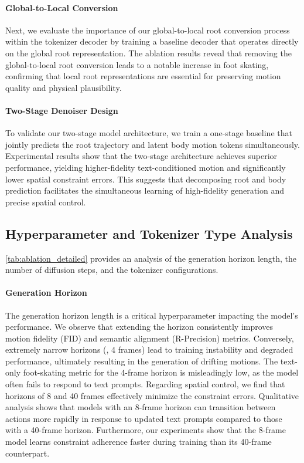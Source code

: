 \paragraph{Global-to-Local Conversion}
Next, we evaluate the importance of our global-to-local root conversion process within the tokenizer decoder by training a baseline decoder that operates directly on the global root representation. The ablation results reveal that removing the global-to-local root conversion leads to a notable increase in foot skating, confirming that local root representations are essential for preserving motion quality and physical plausibility.

\paragraph{Two-Stage Denoiser Design}
To validate our two-stage model architecture, we train a one-stage baseline that jointly predicts the root trajectory and latent body motion tokens simultaneously. Experimental results show that the two-stage architecture achieves superior performance, yielding higher-fidelity text-conditioned motion and significantly lower spatial constraint errors. This suggests that decomposing root and body prediction facilitates the simultaneous learning of high-fidelity generation and precise spatial control.

\subsection{Hyperparameter and Tokenizer Type Analysis}
\label{sec:results_hyperparams}

\cref{tab:ablation_detailed} provides an analysis of the generation horizon length, the number of diffusion steps, and the tokenizer configurations.

\paragraph{Generation Horizon}
The generation horizon length is a critical hyperparameter impacting the model's performance. We observe that extending the horizon consistently improves motion fidelity (FID) and semantic alignment (R-Precision) metrics. Conversely, extremely narrow horizons (\eg, 4 frames) lead to training instability and degraded performance, ultimately resulting in the generation of drifting motions. The text-only foot-skating metric for the 4-frame horizon is misleadingly low, as the model often fails to respond to text prompts. Regarding spatial control, we find that horizons of 8 and 40 frames effectively minimize the constraint errors.
Qualitative analysis shows that models with an 8-frame horizon can transition between actions more rapidly in response to updated text prompts compared to those with a 40-frame horizon. Furthermore, our experiments show that the 8-frame model learns constraint adherence faster during training than its 40-frame counterpart.

